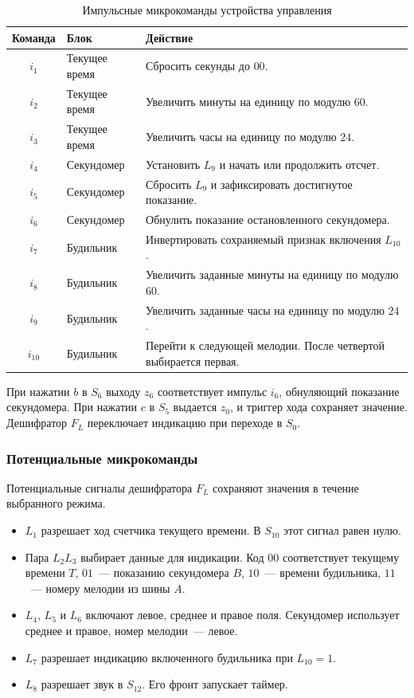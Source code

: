 \begin{table}[H]
	\centering
	\caption{Импульсные микрокоманды устройства управления}
	\label{tab:clock-pulses}
	\small{}
	\renewcommand{\arraystretch}{1.12}
	\begin{tabularx}{\textwidth}{|c|>{\raggedright\arraybackslash}p{3.25cm}|>{\raggedright\arraybackslash}X|}
		\hline
		Команда & Блок & Действие \\
		\hline
		$i_1$ & Текущее время & Сбросить секунды до $00$. \\
		$i_2$ & Текущее время & Увеличить минуты на единицу по модулю $60$. \\
		$i_3$ & Текущее время & Увеличить часы на единицу по модулю $24$. \\
		$i_4$ & Секундомер & Установить $L_9$ и начать или продолжить отсчет. \\
		$i_5$ & Секундомер & Сбросить $L_9$ и зафиксировать достигнутое показание. \\
		$i_6$ & Секундомер & Обнулить показание остановленного секундомера. \\
		$i_7$ & Будильник & Инвертировать сохраняемый признак включения $L_{10}$. \\
		$i_8$ & Будильник & Увеличить заданные минуты на единицу по модулю $60$. \\
		$i_9$ & Будильник & Увеличить заданные часы на единицу по модулю $24$. \\
		$i_{10}$ & Будильник & Перейти к следующей мелодии. После четвертой выбирается первая. \\
		\hline
	\end{tabularx}
\end{table}

При нажатии $b$ в $S_6$ выходу $z_6$ соответствует импульс $i_6$, обнуляющий показание секундомера. При нажатии $c$ в $S_5$ выдается $z_0$, и триггер хода сохраняет значение. Дешифратор $F_L$ переключает индикацию при переходе в $S_0$.

\newpage
\subsubsection{Потенциальные микрокоманды}
\label{sec:clock-levels}

Потенциальные сигналы дешифратора $F_L$ сохраняют значения в течение выбранного режима.

\begin{itemize}
	\item $L_1$ разрешает ход счетчика текущего времени. В $S_{10}$ этот сигнал равен нулю.
	\item Пара $L_2L_3$ выбирает данные для индикации. Код $00$ соответствует текущему времени $T$, $01$~--- показанию секундомера $B$, $10$~--- времени будильника, $11$~--- номеру мелодии из шины $A$.
	\item $L_4$, $L_5$ и $L_6$ включают левое, среднее и правое поля. Секундомер использует среднее и правое, номер мелодии~--- левое.
	\item $L_7$ разрешает индикацию включенного будильника при $L_{10}=1$.
	\item $L_8$ разрешает звук в $S_{12}$. Его фронт запускает таймер.
\end{itemize}

